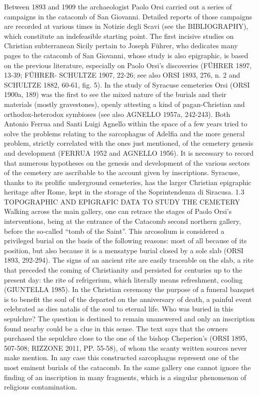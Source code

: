 \documentclass[amsthm,ebook]{saparticle}
\begin{document}
Between 1893 and 1909 the archaeologist Paolo Orsi carried out a series of campaigns in the catacomb of San Giovanni. Detailed reports of those campaigns are recorded at various times in Notizie degli Scavi (see the BIBLIOGRAPHY), which constitute an indefeasible starting point. The first incisive studies on Christian subterranean Sicily pertain to Joseph Führer, who dedicates many pages to the catacomb of San Giovanni, whose study is also epigraphic, is based on the previous literature, especially on Paolo Orsi’s discoveries (FÜHRER 1897, 13-39; FÜHRER- SCHULTZE 1907, 22-26; see also ORSI 1893, 276, n. 2 and SCHULTZE 1882, 60-61, fig. 5). In the study of Syracuse cemeteries Orsi (ORSI 1900a, 189) was the first to see the mixed nature of the burials and their materials (mostly gravestones), openly attesting a kind of pagan-Christian and orthodox-heterodox symbioses (see also AGNELLO 1957a, 242-243). Both Antonio Ferrua and Santi Luigi Agnello within the space of a few years tried to solve the problems relating to the sarcophagus of Adelfia and the more general problem, strictly correlated with the ones just mentioned, of the cemetery genesis and development (FERRUA 1952 and AGNELLO 1956). It is necessary to record that numerous hypotheses on the genesis and development of the various sectors of the cemetery are ascribable to the account given by inscriptions. Syracuse, thanks to its prolific underground cemeteries, has the larger Christian epigraphic heritage after Rome, kept in the storage of the Soprintendenza di Siracusa.
1.3 TOPOGRAPHIC AND EPIGRAFIC DATA TO STUDY THE CEMETERY
Walking across the main gallery, one can retrace the stages of Paolo Orsi’s interventions, being at the entrance of the Catacomb second northern gallery, before the so-called “tomb of the Saint”. This arcosolium is considered a privileged burial on the basis of the following reasons: most of all because of its position, but also because it is a mensatype burial closed by a sole slab (ORSI 1893, 292-294). The signs of an ancient rite are easily traceable on the slab, a rite that preceded the coming of Christianity and persisted for centuries up to the present day: the rite of refrigerium, which literally means refreshment, cooling (GIUNTELLA 1985). In the Christian ceremony the purpose of a funeral banquet is to benefit the soul of the departed on the anniversary of death, a painful event celebrated as dies natalis of the soul to eternal life.
Who was buried in this sepulchre? The question is destined to remain unanswered and only an inscription found nearby could be a clue in this sense. The text says that the owners purchased the sepulchre close to the one of the bishop Cheperion’s (ORSI 1895, 507-508; RIZZONE 2011, PP. 55-58), of whom the scanty written sources never make mention. In any case this constructed sarcophagus represent one of the most eminent burials of the catacomb. In the same gallery one cannot ignore the finding of an inscription in many fragments, which is a singular phenomenon of religious contamination.
\end{document}
